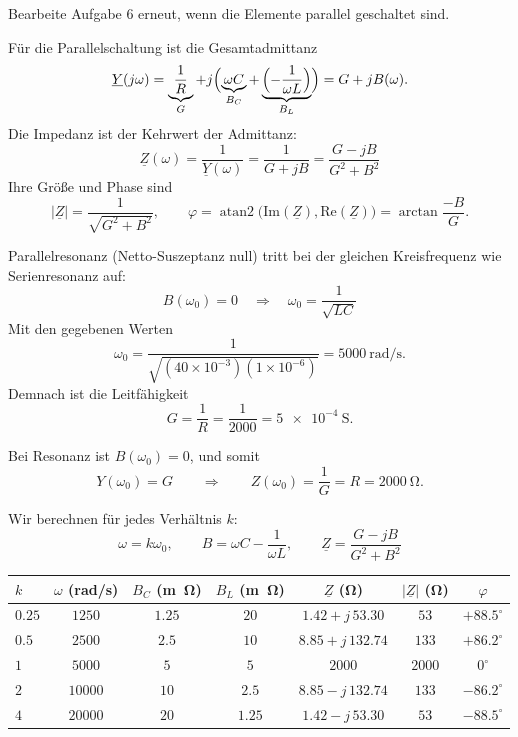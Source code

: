 \documentclass[11pt,a4paper]{article}
\newcounter{exercise}
\newenvironment{exercise}[1][]
  {\refstepcounter{exercise}%
   \begin{tcolorbox}[enhanced, breakable, width=\textwidth,
     colback=blue!5!white,colframe=blue!60!black,
     fonttitle=\bfseries\large,
     title=Aufgabe~\theexercise:~#1]}
  {\end{tcolorbox}}
\newif\ifshowsolutions
\newenvironment{solution}
  {\ifshowsolutions
     \begin{tcolorbox}[enhanced, breakable, width=\textwidth,
       colback=green!5!white,colframe=green!50!black,
       fonttitle=\bfseries\large,
       title=Lösung]}
  {\end{tcolorbox}\fi}
\begin{document}
\begin{exercise}[Parallelschwingkreis]
Bearbeite Aufgabe 6 erneut, wenn die Elemente parallel geschaltet sind.
\end{exercise}

\ifshowsolutions
\begin{solution}
Für die Parallelschaltung ist die Gesamtadmittanz
\[
\underline{Y}(j\omega) = \underbrace{\frac{1}{R}}_{G} + j\Bigl(\underbrace{\omega C}_{B_C} + \underbrace{\Bigl(-\frac{1}{\omega L}\Bigr)}_{B_L}\Bigr) = G + jB(\omega).
\]
Die Impedanz ist der Kehrwert der Admittanz:
\[
\underline{Z}(\omega) = \frac{1}{\underline{Y}(\omega)} = \frac{1}{G+jB} = \frac{G-jB}{G^2+B^2}
\]
Ihre Größe und Phase sind
\[
|\underline{Z}|=\frac{1}{\sqrt{G^2+B^2}},\qquad \varphi = \operatorname{atan2}\bigl(\text{Im}(\underline{Z}),\text{Re}(\underline{Z})\bigr) = \arctan\!\frac{-B}{G}.
\]

Parallelresonanz (Netto-Suszeptanz null) tritt bei der gleichen Kreisfrequenz wie Serienresonanz auf:
\[
B(\omega_0) = 0 \quad\Rightarrow\quad \omega_0 = \frac{1}{\sqrt{LC}}
\]
Mit den gegebenen Werten
\[
\omega_0 = \frac{1}{\sqrt{(40\times10^{-3})(1\times10^{-6})}} = \SI{5000}{\radian\per\second}.
\]
Demnach ist die Leitfähigkeit
\[
G = \frac{1}{R} = \frac{1}{2000} = \SI{5e-4}{\siemens}.
\]

Bei Resonanz ist $B(\omega_0)=0$, und somit
\[
Y(\omega_0) = G \qquad\Rightarrow\qquad Z(\omega_0) = \frac{1}{G} = R = \SI{2000}{\ohm}.
\]

Wir berechnen für jedes Verhältnis \(k\):
\[
\omega = k\omega_0,\qquad B = \omega C-\frac{1}{\omega L},\qquad \underline{Z} = \frac{G-jB}{G^2+B^2}
\]

\bigskip
\begin{tabular}{@{}lcccccc@{}}
\toprule
$k$ & $\omega$ (rad/s) & $B_C$ (\si{m\ohm}) & $B_L$ (\si{m\ohm}) & $\underline{Z}$ (\si{\ohm}) & $|\underline{Z}|$ (\si{\ohm}) & $\varphi$ \\
\midrule
$0.25$ & $1250$ & $1.25$ & $20$ & $1.42 + j\,53.30$ & $53$ & $+88.5^\circ$ \\[4pt]
$0.5$ & $2500$ & $2.5$ & $10$ & $8.85 + j\,132.74$ & $133$ & $+86.2^\circ$ \\[4pt]
$1$ & $5000$ & $5$ & $5$ & $2000$ & $2000$ & $0^\circ$ \\[4pt]
$2$ & $10000$ & $10$ & $2.5$ & $8.85 - j\,132.74$ & $133$ & $-86.2^\circ$ \\[4pt]
$4$ & $20000$ & $20$ & $1.25$ & $1.42 - j\,53.30$ & $53$ & $-88.5^\circ$ \\
\bottomrule
\end{tabular}


\end{solution}
\end{document}
